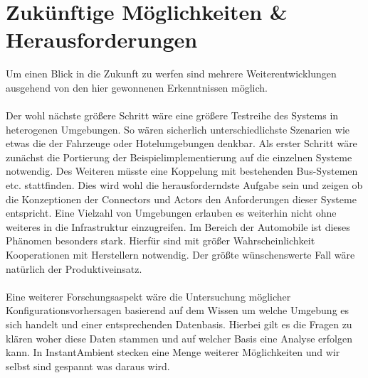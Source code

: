 \section{Zukünftige Möglichkeiten & Herausforderungen}
Um einen Blick in die Zukunft zu werfen sind mehrere Weiterentwicklungen ausgehend von den hier gewonnenen Erkenntnissen möglich. 
\\\\
Der wohl nächste größere Schritt wäre eine größere Testreihe des Systems in heterogenen Umgebungen. So wären sicherlich unterschiedlichste Szenarien wie etwas die der Fahrzeuge oder Hotelumgebungen denkbar. Als erster Schritt wäre zunächst die Portierung der Beispielimplementierung auf die einzelnen Systeme notwendig. Des Weiteren müsste eine Koppelung mit bestehenden Bus-Systemen etc. stattfinden. Dies wird wohl die herausforderndste Aufgabe sein und zeigen ob die Konzeptionen der Connectors und Actors den Anforderungen dieser Systeme entspricht. Eine Vielzahl von Umgebungen erlauben es weiterhin nicht ohne weiteres in die Infrastruktur einzugreifen. Im Bereich der Automobile ist dieses Phänomen besonders stark. Hierfür sind mit größer Wahrscheinlichkeit Kooperationen mit Herstellern notwendig. Der größte wünschenswerte Fall wäre natürlich der Produktiveinsatz. 
\\\\
Eine weiterer Forschungsaspekt wäre die Untersuchung möglicher Konfigurationsvorhersagen basierend auf dem Wissen um welche Umgebung es sich handelt und einer entsprechenden Datenbasis. Hierbei gilt es die Fragen zu klären woher diese Daten stammen und auf welcher Basis eine Analyse erfolgen kann. In InstantAmbient stecken eine Menge weiterer Möglichkeiten und wir selbst sind gespannt was daraus wird. 